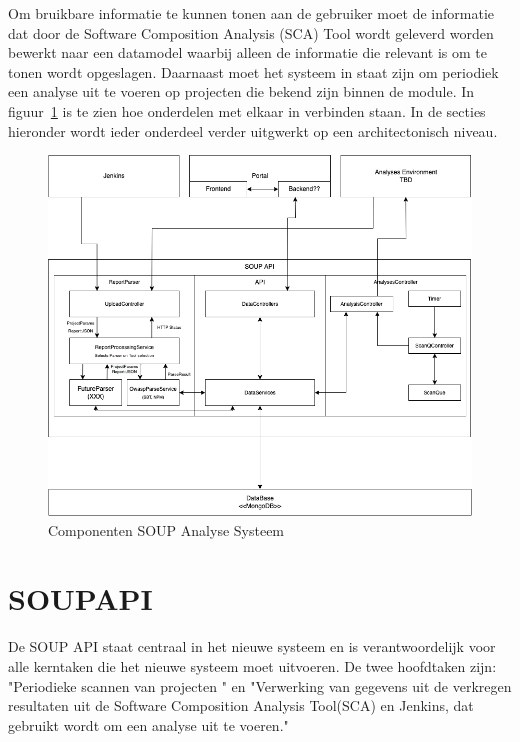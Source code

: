 Om bruikbare informatie te kunnen tonen aan de gebruiker moet de informatie dat door de Software Composition Analysis (SCA) Tool wordt geleverd worden bewerkt naar een datamodel waarbij alleen de informatie die relevant is om te tonen wordt opgeslagen. Daarnaast moet het systeem in staat zijn om periodiek een analyse uit te voeren op projecten die bekend zijn binnen de module. In figuur~\ref{fig:SOUP-Components} is te zien hoe onderdelen met elkaar in verbinden staan.
In de secties hieronder wordt ieder onderdeel verder uitgwerkt op een architectonisch niveau.


\begin{figure}[bth]
    \myfloatalign
    \includegraphics[width=15cm]{gfx/SOUPAPI-SOUPAPI MODULES}
    \caption{Componenten SOUP Analyse Systeem}
    \label{fig:SOUP-Components}
\end{figure}




\section{SOUPAPI}\label{sec:soupapi}
De SOUP API staat centraal in het nieuwe systeem en is verantwoordelijk voor alle kerntaken die het nieuwe systeem moet uitvoeren. De twee hoofdtaken zijn: "Periodieke scannen van projecten " en "Verwerking van gegevens uit de verkregen resultaten uit de Software Composition Analysis Tool(SCA) en Jenkins, dat gebruikt wordt om een analyse uit te voeren."

